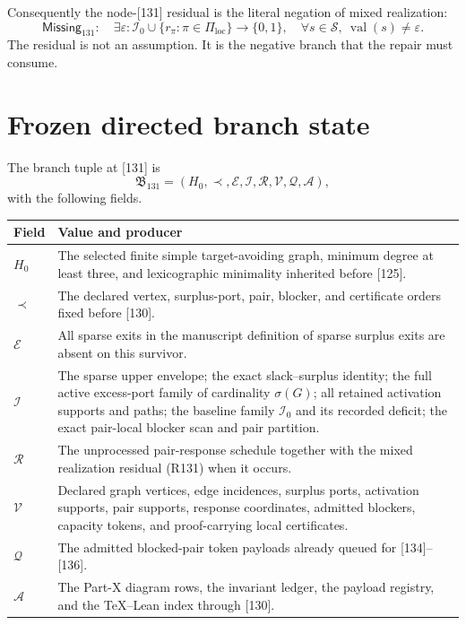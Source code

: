 \documentclass[11pt]{article}
\newcommand{\States}{\mathcal S}
\newcommand{\Coords}{\mathcal I}
\newcommand{\Pair}{\Pi}
\begin{document}
Consequently the node-[131] residual is the literal negation of mixed
realization:
\[
\mathsf{Missing}_{131}:\quad
\exists\varepsilon:\Coords_0\cup
  \{r_\pi:\pi\in\Pair_{\mathrm{loc}}\}\to\{0,1\},\quad
\forall s\in\States,\ \operatorname{val}(s)\ne\varepsilon . \tag{R131}
\]
The residual is not an assumption.  It is the negative branch that the
repair must consume.

\section{Frozen directed branch state}

The branch tuple at [131] is
\[
\mathfrak B_{131}=(H_0,\prec,\mathcal E,\mathcal I,
\mathcal R,\mathcal V,\mathcal Q,\mathcal A),
\]
with the following fields.
\begin{longtable}{>{\raggedright\arraybackslash}p{}
                  >{\raggedright\arraybackslash}p{}}
\toprule
Field & Value and producer \\
\midrule
$H_0$ & The selected finite simple target-avoiding graph, minimum degree at
least three, and lexicographic minimality inherited before [125]. \\
$\prec$ & The declared vertex, surplus-port, pair, blocker, and certificate
orders fixed before [130]. \\
$\mathcal E$ & All sparse exits in the manuscript definition of sparse surplus
exits are absent on this survivor. \\
$\mathcal I$ & The sparse upper envelope; the exact slack--surplus identity;
the full active excess-port family of cardinality $\sigma(G)$; all retained
activation supports and paths; the baseline family $\Coords_0$ and its
recorded deficit; the exact pair-local blocker scan and pair partition. \\
$\mathcal R$ & The unprocessed pair-response schedule together with the mixed
realization residual (R131) when it occurs. \\
$\mathcal V$ & Declared graph vertices, edge incidences, surplus ports,
activation supports, pair supports, response coordinates, admitted blockers,
capacity tokens, and proof-carrying local certificates. \\
$\mathcal Q$ & The admitted blocked-pair token payloads already queued for
[134]--[136]. \\
$\mathcal A$ & The Part-X diagram rows, the invariant ledger, the payload
registry, and the TeX--Lean index through [130]. \\
\bottomrule
\end{longtable}
\end{document}
